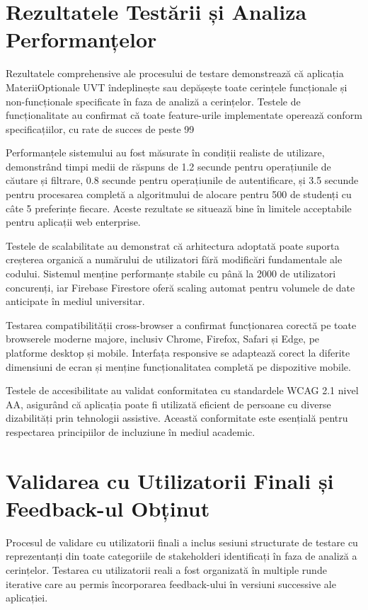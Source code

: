 \documentclass[12pt,a4paper]{report}
\begin{document}
\section{Rezultatele Testării și Analiza Performanțelor}

Rezultatele comprehensive ale procesului de testare demonstrează că aplicația MateriiOptionale UVT îndeplinește sau depășește toate cerințele funcționale și non-funcționale specificate în faza de analiză a cerințelor. Testele de funcționalitate au confirmat că toate feature-urile implementate operează conform specificațiilor, cu rate de succes de peste 99%

Performanțele sistemului au fost măsurate în condiții realiste de utilizare, demonstrând timpi medii de răspuns de 1.2 secunde pentru operațiunile de căutare și filtrare, 0.8 secunde pentru operațiunile de autentificare, și 3.5 secunde pentru procesarea completă a algoritmului de alocare pentru 500 de studenți cu câte 5 preferințe fiecare. Aceste rezultate se situează bine în limitele acceptabile pentru aplicații web enterprise.

Testele de scalabilitate au demonstrat că arhitectura adoptată poate suporta creșterea organică a numărului de utilizatori fără modificări fundamentale ale codului. Sistemul menține performanțe stabile cu până la 2000 de utilizatori concurenți, iar Firebase Firestore oferă scaling automat pentru volumele de date anticipate în mediul universitar.

Testarea compatibilității cross-browser a confirmat funcționarea corectă pe toate browserele moderne majore, inclusiv Chrome, Firefox, Safari și Edge, pe platforme desktop și mobile. Interfața responsive se adaptează corect la diferite dimensiuni de ecran și menține funcționalitatea completă pe dispozitive mobile.

Testele de accesibilitate au validat conformitatea cu standardele WCAG 2.1 nivel AA, asigurând că aplicația poate fi utilizată eficient de persoane cu diverse dizabilități prin tehnologii assistive. Această conformitate este esențială pentru respectarea principiilor de incluziune în mediul academic.

\section{Validarea cu Utilizatorii Finali și Feedback-ul Obținut}

Procesul de validare cu utilizatorii finali a inclus sesiuni structurate de testare cu reprezentanți din toate categoriile de stakeholderi identificați în faza de analiză a cerințelor. Testarea cu utilizatorii reali a fost organizată în multiple runde iterative care au permis încorporarea feedback-ului în versiuni successive ale aplicației.
\end{document}
